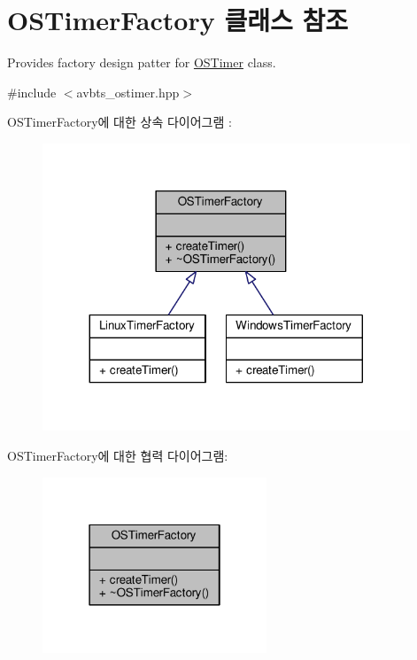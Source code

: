 \hypertarget{class_o_s_timer_factory}{}\section{O\+S\+Timer\+Factory 클래스 참조}
\label{class_o_s_timer_factory}


Provides factory design patter for \hyperlink{class_o_s_timer}{O\+S\+Timer} class.  




{\ttfamily \#include $<$avbts\+\_\+ostimer.\+hpp$>$}



O\+S\+Timer\+Factory에 대한 상속 다이어그램 \+: 
\nopagebreak
\begin{figure}[H]
\begin{center}
\leavevmode
\includegraphics[width=311pt]{class_o_s_timer_factory__inherit__graph}
\end{center}
\end{figure}


O\+S\+Timer\+Factory에 대한 협력 다이어그램\+:
\nopagebreak
\begin{figure}[H]
\begin{center}
\leavevmode
\includegraphics[width=190pt]{class_o_s_timer_factory__coll__graph}
\end{center}
\end{figure}
